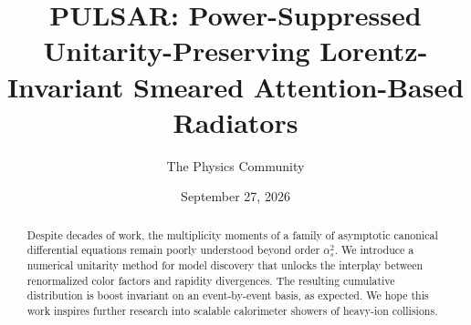 \documentclass[11pt]{article}
\title{PULSAR: Power-Suppressed Unitarity-Preserving Lorentz-Invariant Smeared Attention-Based Radiators}
\author{The Physics Community}
\date{September 27, 2026}
\numberwithin{equation}{section}
\theoremstyle{definition}
\theoremstyle{remark}
\begin{document}
\maketitle
\begin{abstract}
Despite decades of work, the multiplicity moments of a family of
asymptotic canonical differential equations remain poorly understood
beyond order $\alpha_s^2$. We introduce a numerical unitarity method for
model discovery that unlocks the interplay between renormalized color
factors and rapidity divergences. The resulting cumulative distribution
is boost invariant on an event-by-event basis, as expected. We hope this
work inspires further research into scalable calorimeter showers of
heavy-ion collisions.
\end{abstract}
\tableofcontents



\nocite{*}


\end{document}
